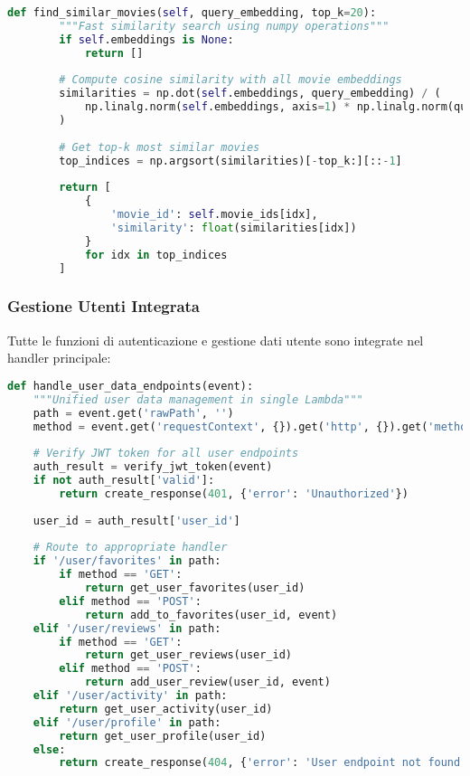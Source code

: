 \documentclass[11pt,a4paper]{article}
\begin{document}
\begin{lstlisting}[language=Python, caption=ONNX Inference Engine]
    def find_similar_movies(self, query_embedding, top_k=20):
        """Fast similarity search using numpy operations"""
        if self.embeddings is None:
            return []
        
        # Compute cosine similarity with all movie embeddings
        similarities = np.dot(self.embeddings, query_embedding) / (
            np.linalg.norm(self.embeddings, axis=1) * np.linalg.norm(query_embedding)
        )
        
        # Get top-k most similar movies
        top_indices = np.argsort(similarities)[-top_k:][::-1]
        
        return [
            {
                'movie_id': self.movie_ids[idx],
                'similarity': float(similarities[idx])
            }
            for idx in top_indices
        ]
\end{lstlisting}

\subsubsection{Gestione Utenti Integrata}
Tutte le funzioni di autenticazione e gestione dati utente sono integrate nel handler principale:

\begin{lstlisting}[language=Python, caption=Gestione Utenti Unificata]
def handle_user_data_endpoints(event):
    """Unified user data management in single Lambda"""
    path = event.get('rawPath', '')
    method = event.get('requestContext', {}).get('http', {}).get('method', '')
    
    # Verify JWT token for all user endpoints
    auth_result = verify_jwt_token(event)
    if not auth_result['valid']:
        return create_response(401, {'error': 'Unauthorized'})
    
    user_id = auth_result['user_id']
    
    # Route to appropriate handler
    if '/user/favorites' in path:
        if method == 'GET':
            return get_user_favorites(user_id)
        elif method == 'POST':
            return add_to_favorites(user_id, event)
    elif '/user/reviews' in path:
        if method == 'GET':
            return get_user_reviews(user_id)
        elif method == 'POST':
            return add_user_review(user_id, event)
    elif '/user/activity' in path:
        return get_user_activity(user_id)
    elif '/user/profile' in path:
        return get_user_profile(user_id)
    else:
        return create_response(404, {'error': 'User endpoint not found'})
\end{lstlisting}
\end{document}

